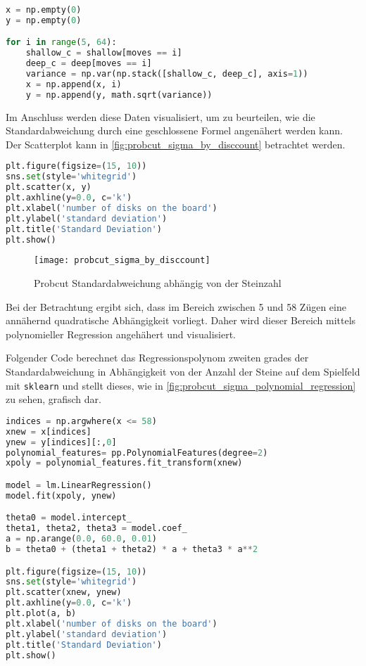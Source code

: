 \begin{lstlisting}[language=Python]
x = np.empty(0)
y = np.empty(0)

for i in range(5, 64):
    shallow_c = shallow[moves == i]
    deep_c = deep[moves == i]
    variance = np.var(np.stack([shallow_c, deep_c], axis=1))
    x = np.append(x, i)
    y = np.append(y, math.sqrt(variance))
\end{lstlisting}

Im Anschluss werden diese Daten visualisiert, um zu beurteilen, wie die
Standardabweichung durch eine geschlossene Formel angenähert werden
kann. Der Scatterplot kann in \autoref{fig:probcut_sigma_by_disccount}
betrachtet werden.

\begin{lstlisting}[language=Python]
plt.figure(figsize=(15, 10))
sns.set(style='whitegrid')
plt.scatter(x, y)
plt.axhline(y=0.0, c='k')
plt.xlabel('number of disks on the board')
plt.ylabel('standard deviation')
plt.title('Standard Deviation')
plt.show()
\end{lstlisting}

\begin{figure}[H]
    \centering
    \texttt{[image: probcut\_sigma\_by\_disccount]}
    \caption{Probcut Standardabweichung abhängig von der Steinzahl}
    \label{fig:probcut_sigma_by_disccount}
\end{figure}

Bei der Betrachtung ergibt sich, dass im Bereich zwischen 5 und 58 Zügen
eine annähernd quadratische Abhängigkeit vorliegt. Daher wird dieser
Bereich mittels polynomieller Regression angehähert und visualisiert.

Folgender Code berechnet das Regressionspolynom zweiten grades der
Standardabweichung in Abhängigkeit von der Anzahl der Steine auf dem
Spielfeld mit \passthrough{\lstinline!sklearn!} und stellt dieses, wie
in \autoref{fig:probcut_sigma_polynomial_regression} zu sehen, grafisch
dar.

\begin{lstlisting}[language=Python]
indices = np.argwhere(x <= 58)
xnew = x[indices]
ynew = y[indices][:,0]
polynomial_features= pp.PolynomialFeatures(degree=2)
xpoly = polynomial_features.fit_transform(xnew)

model = lm.LinearRegression()
model.fit(xpoly, ynew)

theta0 = model.intercept_
theta1, theta2, theta3 = model.coef_
a = np.arange(0.0, 60.0, 0.01)
b = theta0 + (theta1 + theta2) * a + theta3 * a**2

plt.figure(figsize=(15, 10))
sns.set(style='whitegrid')
plt.scatter(xnew, ynew)
plt.axhline(y=0.0, c='k')
plt.plot(a, b)
plt.xlabel('number of disks on the board')
plt.ylabel('standard deviation')
plt.title('Standard Deviation')
plt.show()
\end{lstlisting}

